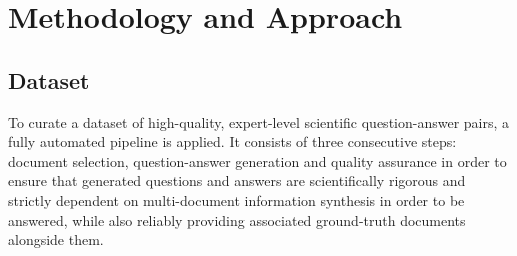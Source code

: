 \chapter{Methodology and Approach}
\label{cha:MethodologyAndApproach}

\section{Dataset}


% 

To curate a dataset of high-quality, expert-level scientific question-answer pairs, a fully automated pipeline is applied. 
It consists of three consecutive steps: document selection, question-answer generation and quality assurance in order to ensure that generated questions and answers are scientifically rigorous and strictly dependent on multi-document information synthesis in order to be answered, while also reliably providing associated ground-truth documents alongside them.

